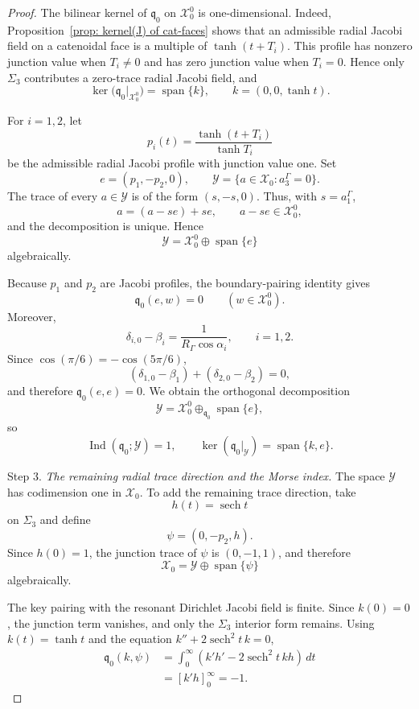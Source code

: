 \documentclass[11pt,twoside]{amsart}
\numberwithin{equation}{section}
\begin{document}
\begin{proof}
The bilinear kernel of $\mathfrak q_0$ on $\mathcal X_0^0$ is one-dimensional. Indeed, Proposition~\ref{prop: kernel(J) of cat-faces} shows that an admissible radial Jacobi field on a catenoidal face is a multiple of $\tanh(t+T_i)$. This profile has nonzero junction value when $T_i\neq0$ and has zero junction value when $T_i=0$. Hence only $\Sigma_3$ contributes a zero-trace radial Jacobi field, and
\[
\ker\bigl(\mathfrak q_0|_{\mathcal X_0^0}\bigr)
=\operatorname{span}\{k\},
\qquad
k=(0,0,\tanh t).
\]

For $i=1,2$, let
\[
p_i(t)=\frac{\tanh(t+T_i)}{\tanh T_i}
\]
be the admissible radial Jacobi profile with junction value one. Set
\[
e=(p_1,-p_2,0),
\qquad
\mathcal Y=\{a\in\mathcal X_0:a_3^\Gamma=0\}.
\]
The trace of every $a\in\mathcal Y$ is of the form $(s,-s,0)$. Thus, with $s=a_1^\Gamma$,
\[
a=(a-se)+se,
\qquad a-se\in\mathcal X_0^0,
\]
and the decomposition is unique. Hence
\[
\mathcal Y=\mathcal X_0^0\oplus\operatorname{span}\{e\}
\]
algebraically.

Because $p_1$ and $p_2$ are Jacobi profiles, the boundary-pairing identity gives
\[
\mathfrak q_0(e,w)=0
\qquad(w\in\mathcal X_0^0).
\]
Moreover,
\[
\delta_{i,0}-\beta_i=\frac{1}{R_\Gamma\cos\alpha_i},
\qquad i=1,2.
\]
Since $\cos(\pi/6)=-\cos(5\pi/6)$,
\[
(\delta_{1,0}-\beta_1)+(\delta_{2,0}-\beta_2)=0,
\]
and therefore $\mathfrak q_0(e,e)=0$. We obtain the orthogonal decomposition
\[
\mathcal Y
=\mathcal X_0^0\oplus_{\mathfrak q_0}\operatorname{span}\{e\},
\]
so
\[
\operatorname{Ind}(\mathfrak q_0;\mathcal Y)=1,
\qquad
\ker(\mathfrak q_0|_{\mathcal Y})=\operatorname{span}\{k,e\}.
\]

\medskip
\noindent Step 3. \emph{The remaining radial trace direction and the Morse index.}
The space $\mathcal Y$ has codimension one in $\mathcal X_0$. To add the remaining trace direction, take
\[
h(t)=\operatorname{sech}t
\]
on $\Sigma_3$ and define
\[
\psi=(0,-p_2,h).
\]
Since $h(0)=1$, the junction trace of $\psi$ is $(0,-1,1)$, and therefore
\[
\mathcal X_0=\mathcal Y\oplus\operatorname{span}\{\psi\}
\]
algebraically.

The key pairing with the resonant Dirichlet Jacobi field is finite. Since $k(0)=0$, the junction term vanishes, and only the $\Sigma_3$ interior form remains. Using $k(t)=\tanh t$ and the equation $k''+2\operatorname{sech}^2t\,k=0$,
\[
\begin{aligned}
\mathfrak q_0(k,\psi)
&=\int_0^\infty
\left(k'h'-2\operatorname{sech}^2t\,kh\right)\,dt\\
&=[k'h]_{0}^{\infty}=-1.
\end{aligned}
\]


\end{proof}
\end{document}
